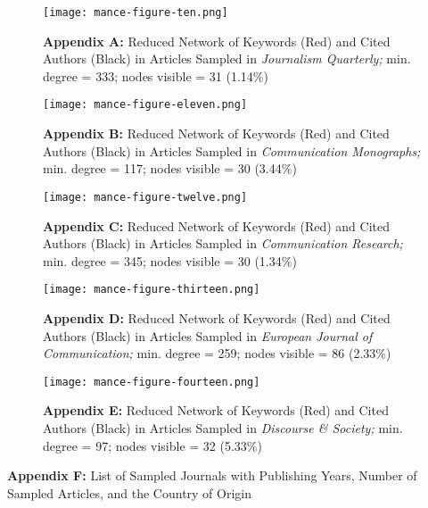 \documentclass{tufte-handout}
\begin{document}
\begin{hangparas}{.25in}{1}
\begin{figure}
    \centering
    \texttt{[image: mance-figure-ten.png]}
    \caption*{\textbf{Appendix A: }Reduced Network of Keywords (Red) and Cited Authors
(Black) in Articles Sampled in \emph{Journalism Quarterly;} min. degree
= 333; nodes visible = 31 (1.14\%)}
\end{figure}

\begin{figure}
    \centering
    \texttt{[image: mance-figure-eleven.png]}
    \caption*{\textbf{Appendix B:} Reduced Network of Keywords (Red) and Cited Authors
(Black) in Articles Sampled in \emph{Communication Monographs;} min.
degree = 117; nodes visible = 30 (3.44\%)}
    \label{fig:eleven}
\end{figure}


\begin{figure}
    \centering
    \texttt{[image: mance-figure-twelve.png]}
    \caption*{\textbf{Appendix C:} Reduced Network of Keywords (Red) and Cited Authors
(Black) in Articles Sampled in \emph{Communication Research;} min.
degree = 345; nodes visible = 30 (1.34\%)
}
    \label{fig:twelve}
\end{figure}


\begin{figure}
    \centering
    \texttt{[image: mance-figure-thirteen.png]}
    \caption*{\textbf{Appendix D:} Reduced Network of Keywords (Red) and Cited Authors
(Black) in Articles Sampled in \emph{European Journal of Communication;}
min. degree = 259; nodes visible = 86 (2.33\%)}
    \label{fig:thirteen}
\end{figure}


\begin{figure}
    \centering
    \texttt{[image: mance-figure-fourteen.png]}
    \caption*{\textbf{Appendix E:} Reduced Network of Keywords (Red) and Cited Authors
(Black) in Articles Sampled in \emph{Discourse \& Society;} min. degree
= 97; nodes visible = 32 (5.33\%)}
    \label{fig:fourteen}
\end{figure}



\newpage

\begin{fullwidth}


\textbf{Appendix F:} List of Sampled Journals with Publishing Years,
Number of Sampled Articles, and the Country of Origin

\vspace*{2em}



\end{fullwidth}
\end{hangparas}
\end{document}
